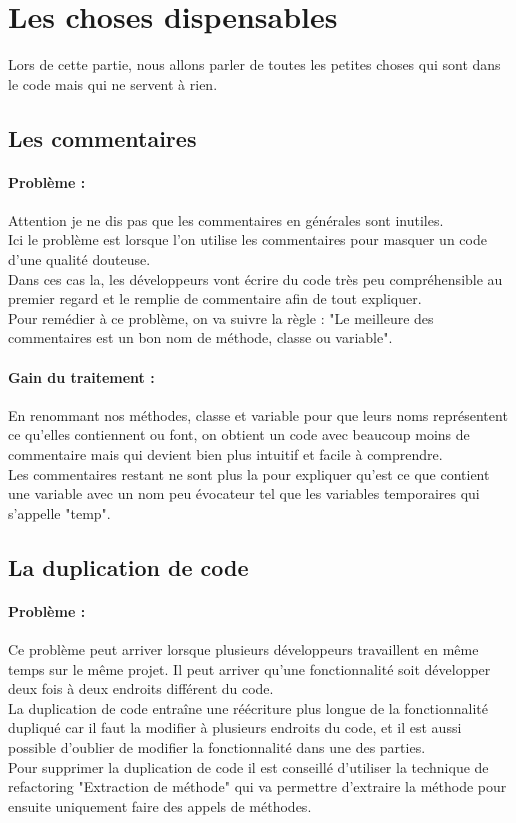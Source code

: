 \documentclass[a4paper,twoside,12pt,openright]{report}
\begin{document}
\section{Les choses dispensables}
Lors de cette partie, nous allons parler de toutes les petites choses qui sont dans le code mais qui ne servent à rien.

\subsection{Les commentaires}
\paragraph{Problème :}
Attention je ne dis pas que les commentaires en générales sont inutiles.\\
Ici le problème est lorsque l'on utilise les commentaires pour masquer un code d'une qualité douteuse.\\
Dans ces cas la, les développeurs vont écrire du code très peu compréhensible au premier regard et le remplie de commentaire afin de tout expliquer.\\
Pour remédier à ce problème, on va suivre la règle : "Le meilleure des commentaires est un bon nom de méthode, classe ou variable".\\

\paragraph{Gain du traitement :}
En renommant nos méthodes, classe et variable pour que leurs noms représentent ce qu'elles contiennent ou font, on obtient un code avec beaucoup moins de commentaire mais qui devient bien plus intuitif et facile à comprendre.\\
Les commentaires restant ne sont plus la pour expliquer qu'est ce que contient une variable avec un nom peu évocateur tel que les variables temporaires qui s'appelle "temp".\\

\subsection{La duplication de code}
\paragraph{Problème :}
Ce problème peut arriver lorsque plusieurs développeurs travaillent en même temps sur le même projet. Il peut arriver qu'une fonctionnalité soit développer deux fois à deux endroits différent du code.\\
La duplication de code entraîne une réécriture plus longue de la fonctionnalité dupliqué car il faut la modifier à plusieurs endroits du code, et il est aussi possible d'oublier de modifier la fonctionnalité dans une des parties.\\
Pour supprimer la duplication de code il est conseillé d'utiliser la technique de refactoring "Extraction de méthode" qui va permettre d'extraire la méthode pour ensuite uniquement faire des appels de méthodes.\\
\end{document}
